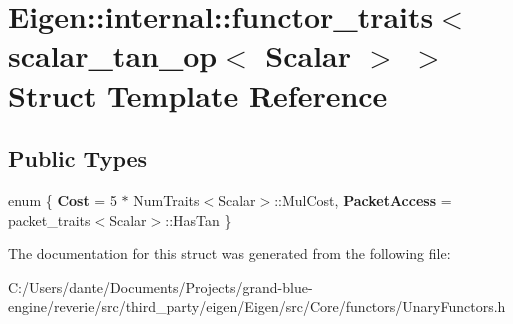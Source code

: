 \hypertarget{struct_eigen_1_1internal_1_1functor__traits_3_01scalar__tan__op_3_01_scalar_01_4_01_4}{}\section{Eigen\+::internal\+::functor\+\_\+traits$<$ scalar\+\_\+tan\+\_\+op$<$ Scalar $>$ $>$ Struct Template Reference}
\label{struct_eigen_1_1internal_1_1functor__traits_3_01scalar__tan__op_3_01_scalar_01_4_01_4}
\subsection*{Public Types}
\begin{DoxyCompactItemize}
\item 
\mbox{\label{struct_eigen_1_1internal_1_1functor__traits_3_01scalar__tan__op_3_01_scalar_01_4_01_4_a0358383889aa52e244fe16f63c540dbd}} 
enum \{ {\bfseries Cost} = 5 $\ast$ Num\+Traits$<$Scalar$>$\+::Mul\+Cost, 
{\bfseries Packet\+Access} = packet\+\_\+traits$<$Scalar$>$\+::Has\+Tan
 \}
\end{DoxyCompactItemize}


The documentation for this struct was generated from the following file\+:\begin{DoxyCompactItemize}
\item 
C\+:/\+Users/dante/\+Documents/\+Projects/grand-\/blue-\/engine/reverie/src/third\+\_\+party/eigen/\+Eigen/src/\+Core/functors/Unary\+Functors.\+h\end{DoxyCompactItemize}
